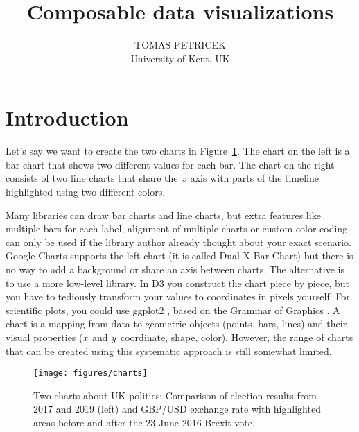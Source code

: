 \documentclass{jfp}
\title{Composable data visualizations}
\author[Tomas Petricek]{TOMAS PETRICEK\\
       University of Kent, UK\\
       \email{t.petricek@kent.ac.uk}}
\newcommand{\X}{\emph{x}\ }
\newcommand{\Y}{\emph{y}\ }
\begin{document}
\maketitle[f]



\section{Introduction}
Let's say we want to create the two charts in Figure~\ref{fig:charts}. The chart on the left is
a bar chart that shows two different values for each bar. The chart on the right consists of two
line charts that share the \X axis with parts of the timeline highlighted using two different colors.

Many libraries can draw bar charts and line charts, but extra features like multiple bars
for each label, alignment of multiple charts or custom color coding can only be used if the
library author already thought about your exact scenario.
Google Charts \cite{gcharts} supports the left chart (it is called Dual-X Bar Chart) but there is no
way to add a background or share an axis between charts. The alternative is to use a more
low-level library. In D3 \cite{d3} you construct the chart piece by piece, but you have to
tediously transform your values to coordinates in pixels yourself. For scientific plots,
you could use ggplot2 \cite{ggplot2}, based on the Grammar of Graphics \cite{grammar}.
A chart is a mapping from data to geometric objects (points, bars, lines) and their visual
properties (\X and \Y coordinate, shape, color). However, the range of charts that can be
created using this systematic approach is still somewhat limited.

\begin{figure}[b]
  \vspace{0.5em}
  \texttt{[image: figures/charts]}
  \vspace{0.25em}
  \caption{Two charts about UK politics: Comparison of election results from 2017 and 2019 (left)
  and GBP/USD exchange rate with highlighted areas before and after the 23 June 2016 Brexit vote.}
  \label{fig:charts}
\end{figure}
\end{document}
